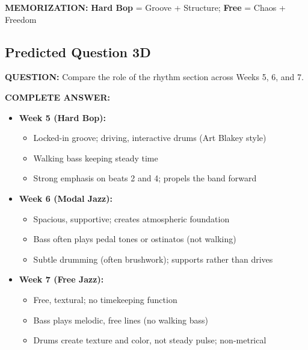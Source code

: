 \documentclass[11pt]{article}
\begin{document}
\textbf{MEMORIZATION:} \textcolor{hardbop}{\textbf{Hard Bop}} = Groove + Structure; \textcolor{freejazz}{\textbf{Free}} = Chaos + Freedom

\subsection*{Predicted Question 3D}

\begin{mdframed}[backgroundcolor=questioncolor!10, linewidth=2pt]
\textbf{\textcolor{questioncolor}{QUESTION:}} Compare the role of the rhythm section across Weeks 5, 6, and 7.
\end{mdframed}

\begin{mdframed}[backgroundcolor=answercolor!10, linewidth=2pt]
\textbf{\textcolor{answercolor}{COMPLETE ANSWER:}}

\begin{itemize}[leftmargin=*, nosep]
    \item \textbf{\textcolor{hardbop}{Week 5 (Hard Bop):}}
    \begin{itemize}[nosep]
        \item Locked-in groove; driving, interactive drums (Art Blakey style)
        \item Walking bass keeping steady time
        \item Strong emphasis on beats 2 and 4; propels the band forward
    \end{itemize}
    
    \item \textbf{\textcolor{modal}{Week 6 (Modal Jazz):}}
    \begin{itemize}[nosep]
        \item Spacious, supportive; creates atmospheric foundation
        \item Bass often plays pedal tones or ostinatos (not walking)
        \item Subtle drumming (often brushwork); supports rather than drives
    \end{itemize}
    
    \item \textbf{\textcolor{freejazz}{Week 7 (Free Jazz):}}
    \begin{itemize}[nosep]
        \item Free, textural; no timekeeping function
        \item Bass plays melodic, free lines (no walking bass)
        \item Drums create texture and color, not steady pulse; non-metrical
    \end{itemize}
\end{itemize}

\vspace{5pt}
\end{mdframed}
\end{document}
